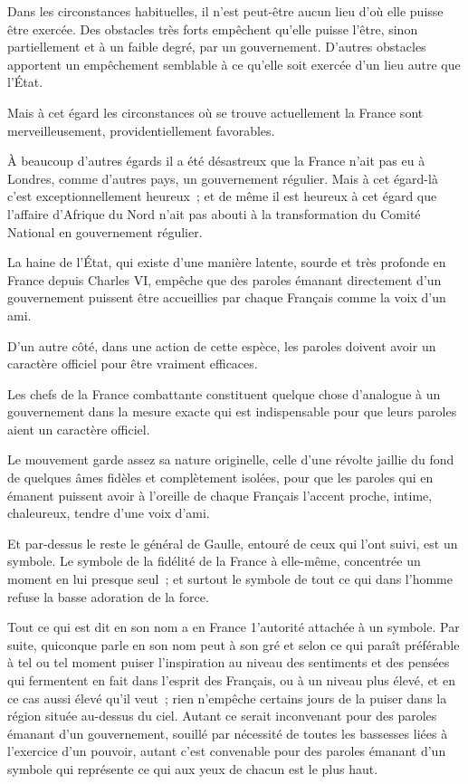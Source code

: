 \documentclass[french,twoside]{book} %
\begin{document}
Dans les circonstances habituelles, il n'est peut-être aucun lieu d'où elle puisse être exercée. Des obstacles très forts empêchent qu'elle puisse l'être, sinon partiellement et à un faible degré, par un gouvernement. D'autres obstacles apportent un empêchement semblable à ce qu'elle soit exercée d'un lieu autre que l'État.\par
Mais à cet égard les circonstances où se trouve actuellement la France sont merveilleusement, providentiellement favorables.\par
À beaucoup d'autres égards il a été désastreux que la France n'ait pas eu à Londres, comme d'autres pays, un gouvernement régulier. Mais à cet égard-là c'est exceptionnellement heureux ; et de même il est heureux à cet égard que l'affaire d'Afrique du Nord n'ait pas abouti à la transformation du Comité National en gouvernement régulier.\par
La haine de l'État, qui existe d'une manière latente, sourde et très profonde en France depuis Charles VI, empêche que des paroles émanant directement d'un gouvernement puissent être accueillies par chaque Français comme la voix d'un ami.\par
D'un autre côté, dans une action de cette espèce, les paroles doivent avoir un caractère officiel pour être vraiment efficaces.\par
Les chefs de la France combattante constituent quelque chose d'analogue à un gouvernement dans la mesure exacte qui est indispensable pour que leurs paroles aient un caractère officiel.\par
Le mouvement garde assez sa nature originelle, celle d'une révolte jaillie du fond de quelques âmes fidèles et complètement isolées, pour que les paroles qui en émanent puissent avoir à l'oreille de chaque Français l'accent proche, intime, chaleureux, tendre d'une voix d'ami.\par
Et par-dessus le reste le général de Gaulle, entouré de ceux qui l'ont suivi, est un symbole. Le symbole de la fidélité de la France à elle-même, concentrée un moment en lui presque seul ; et surtout le symbole de tout ce qui dans l'homme refuse la basse adoration de la force.\par
Tout ce qui est dit en son nom a en France 1'autorité attachée à un symbole. Par suite, quiconque parle en son nom peut à son gré et selon ce qui paraît préférable à tel ou tel moment puiser l'inspiration au niveau des sentiments et des pensées qui fermentent en fait dans l'esprit des Français, ou à un niveau plus élevé, et en ce cas aussi élevé qu'il veut ; rien n'empêche certains jours de la puiser dans la région située au-dessus du ciel. Autant ce serait inconvenant pour des paroles émanant d'un gouvernement, souillé par nécessité de toutes les bassesses liées à l'exercice d'un pouvoir, autant c'est convenable pour des paroles émanant d'un symbole qui représente ce qui aux yeux de chacun est le plus haut.\par
\end{document}
